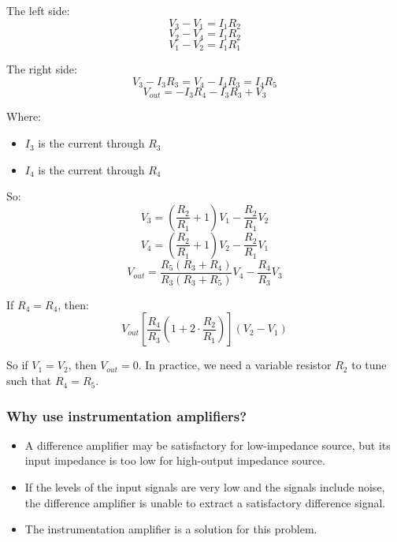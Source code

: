\documentclass[11pt]{article}
\begin{document}
The left side:
\[V_3 - V_1 = I_1 R_2\]
\[V_2 - V_4 = I_1 R_2\]
\[V_1 - V_2 = I_1 R_1\]

The right side:
\[V_3 - I_3 R_3 = V_4 - I_4 R_3 = I_4 R_5\]
\[V_{out} = -I_3 R_4 - I_3 R_3 + V_3\]

Where:
\begin{itemize}
\item \(I_3\) is the current through \(R_3\)
\item \(I_4\) is the current through \(R_4\)
\end{itemize}

 \newpage

So:
\[V_3 = \left(\frac{R_2}{R_1} + 1 \right) V_1 - \frac{R_2}{R_1} V_2\]
\[V_4 = \left(\frac{R_2}{R_1} + 1 \right) V_2 - \frac{R_2}{R_1} V_1\]
\[V_{out} = \frac{R_5 (R_3 + R_4)}{R_3 (R_3 + R_5)} V_4 - \frac{R_4}{R_3} V_3\]

If \(R_4 = R_4\), then:
\[V_{out} \left[\frac{R_4}{R_3} \left(1 + 2 \cdot \frac{R_2}{R_1} \right) \right] (V_2 - V_1)\]

So if \(V_1 = V_2\), then \(V_{out} = 0\). In practice, we need a variable resistor \(R_2\) to tune such that \(R_4 = R_5\).
\subsubsection{Why use instrumentation amplifiers?}
\label{sec:orgd86964c}
\begin{itemize}
\item A difference amplifier may be satisfactory for low-impedance source, but its input impedance is too low for high-output impedance source.
\item If the levels of the input signals are very low and the signals include noise, the difference amplifier is unable to extract a satisfactory difference signal.
\item The instrumentation amplifier is a solution for this problem.
\end{itemize}

 \newpage
\end{document}
